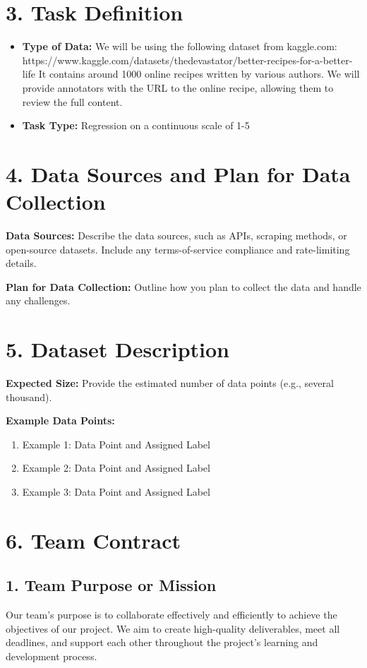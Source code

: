 \documentclass{article}
\begin{document}
\section*{3. Task Definition}
\begin{itemize}
    \item \textbf{Type of Data:} We will be using the following dataset from kaggle.com:
    https://www.kaggle.com/datasets/thedevastator/better-recipes-for-a-better-life
    It contains around 1000 online recipes written by various authors. We will provide annotators with the URL to the online recipe, allowing them to review the full content.
    \item \textbf{Task Type:} Regression on a continuous scale of 1-5
\end{itemize}

\section*{4. Data Sources and Plan for Data Collection}
\textbf{Data Sources:} Describe the data sources, such as APIs, scraping methods, or open-source datasets. Include any terms-of-service compliance and rate-limiting details.

\textbf{Plan for Data Collection:} Outline how you plan to collect the data and handle any challenges.

\section*{5. Dataset Description}
\textbf{Expected Size:} Provide the estimated number of data points (e.g., several thousand).

\textbf{Example Data Points:}
\begin{enumerate}
    \item Example 1: Data Point and Assigned Label
    \item Example 2: Data Point and Assigned Label
    \item Example 3: Data Point and Assigned Label
\end{enumerate}

\section*{6. Team Contract}

\vspace{0.5cm}

\subsection*{1. Team Purpose or Mission}
Our team’s purpose is to collaborate effectively and efficiently to achieve the objectives of our project. We aim to create high-quality deliverables, meet all deadlines, and support each other throughout the project's learning and development process.
\end{document}
